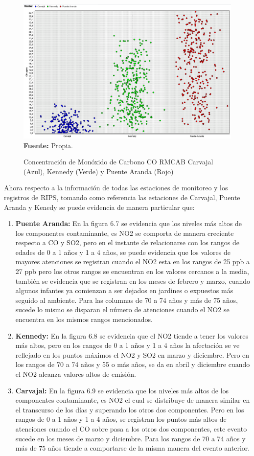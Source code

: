 \documentclass[a4paper,openright,12pt]{book}
\theoremstyle{definition}
\theoremstyle{remark}
\begin{document}
\begin{figure}[h]
\centering
\caption{Concentración de Monóxido de Carbono CO RMCAB Carvajal (Azul), Kennedy (Verde) y Puente Aranda (Rojo)} 
\includegraphics[scale=0.4]{RMCABanalisis/AnalisisRMCABCO}
\label{fig:Tabla1}
\\ \textbf{Fuente: }Propia.
\end{figure}
Ahora respecto a la información de todas las estaciones de monitoreo y los registros de RIPS, tomando como referencia las estaciones de Carvajal, Puente Aranda y Kenedy se puede evidencia de manera particular que:
\begin{enumerate}
	\item \textbf{Puente Aranda:} En la figura 6.7 se evidencia que los niveles más altos de los componentes contaminante, es NO2 se comporta de manera creciente respecto a CO y SO2, pero en el instante de relacionarse con los rangos de edades de 0 a 1 años y 1 a 4 años, se puede evidencia que los valores de mayores atenciones se registran cuando el NO2 esta en los rangos de 25 ppb a 27 ppb pero los otros rangos se encuentran en los valores cercanos a la media, también se evidencia que se registran en los meses de febrero y marzo, cuando algunos infantes ya comienzan a ser dejados en jardines o expuestos más seguido al ambiente. Para las columnas de 70 a 74 años y más de 75 años, sucede lo mismo se disparan el número de atenciones cuando el NO2 se encuentra en los mismos rangos mencionados.
    \item \textbf{Kennedy:} En la figura 6.8 se evidencia que el NO2 tiende a tener los valores más altos, pero en los rangos de 0 a 1 años y 1 a 4 años la afectación se ve reflejado en los puntos máximos el NO2 y SO2 en marzo y diciembre. Pero en los rangos de 70 a 74 años y 55 o más años, se da en abril y diciembre cuando el NO2 alcanza valores altos de emisión.
    \item \textbf{Carvajal:} En la figura 6.9 se evidencia que los niveles más altos de los componentes contaminante, es NO2 el cual se distribuye de  manera similar en el transcurso de los días y superando los otros dos componentes. Pero en los rangos de 0 a 1 años y 1 a 4 años, se registran los puntos más altos de atenciones cuando el CO sobre pasa a los otros dos componentes, este evento sucede en los meses de marzo y diciembre. Para los rangos de 70 a 74 años y más de 75 años tiende a comportarse de la misma manera del evento anterior.
\end{enumerate}
\end{document}
